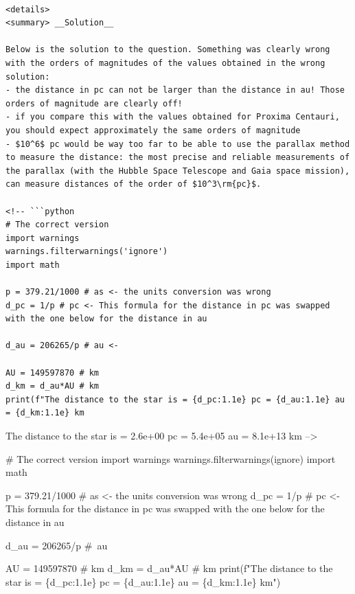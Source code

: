 \documentclass[
  letterpaper,
  DIV=11,
  numbers=noendperiod]{scrreprt}
\newenvironment{Shaded}{\begin{snugshade}}{\end{snugshade}}
\newcommand{\BuiltInTok}[1]{\textcolor[rgb]{0.00,0.23,0.31}{#1}}
\newcommand{\CommentTok}[1]{\textcolor[rgb]{0.37,0.37,0.37}{#1}}
\newcommand{\DecValTok}[1]{\textcolor[rgb]{0.68,0.00,0.00}{#1}}
\newcommand{\FloatTok}[1]{\textcolor[rgb]{0.68,0.00,0.00}{#1}}
\newcommand{\ImportTok}[1]{\textcolor[rgb]{0.00,0.46,0.62}{#1}}
\newcommand{\NormalTok}[1]{\textcolor[rgb]{0.00,0.23,0.31}{#1}}
\newcommand{\OperatorTok}[1]{\textcolor[rgb]{0.37,0.37,0.37}{#1}}
\newcommand{\SpecialCharTok}[1]{\textcolor[rgb]{0.37,0.37,0.37}{#1}}
\newcommand{\SpecialStringTok}[1]{\textcolor[rgb]{0.13,0.47,0.30}{#1}}
\newcommand{\StringTok}[1]{\textcolor[rgb]{0.13,0.47,0.30}{#1}}
\begin{document}
\begin{verbatim}

<details>
<summary> __Solution__

Below is the solution to the question. Something was clearly wrong with the orders of magnitudes of the values obtained in the wrong solution:
- the distance in pc can not be larger than the distance in au! Those orders of magnitude are clearly off!
- if you compare this with the values obtained for Proxima Centauri, you should expect approximately the same orders of magnitude
- $10^6$ pc would be way too far to be able to use the parallax method to measure the distance: the most precise and reliable measurements of the parallax (with the Hubble Space Telescope and Gaia space mission), can measure distances of the order of $10^3\rm{pc}$.

<!-- ```python 
# The correct version
import warnings
warnings.filterwarnings('ignore')
import math

p = 379.21/1000 # as <- the units conversion was wrong
d_pc = 1/p # pc <- This formula for the distance in pc was swapped with the one below for the distance in au

d_au = 206265/p # au <-

AU = 149597870 # km
d_km = d_au*AU # km
print(f"The distance to the star is = {d_pc:1.1e} pc = {d_au:1.1e} au = {d_km:1.1e} km
\end{verbatim}

The distance to the star is = 2.6e+00 pc = 5.4e+05 au = 8.1e+13 km
--\textgreater{}

\begin{Shaded}
\begin{Highlighting}[]
\CommentTok{\# The correct version}
\ImportTok{import}\NormalTok{ warnings}
\NormalTok{warnings.filterwarnings(}\StringTok{\textquotesingle{}ignore\textquotesingle{}}\NormalTok{)}
\ImportTok{import}\NormalTok{ math}

\NormalTok{p }\OperatorTok{=} \FloatTok{379.21}\OperatorTok{/}\DecValTok{1000} \CommentTok{\# as \textless{}{-} the units conversion was wrong}
\NormalTok{d\_pc }\OperatorTok{=} \DecValTok{1}\OperatorTok{/}\NormalTok{p }\CommentTok{\# pc \textless{}{-} This formula for the distance in pc was swapped with the one below for the distance in au}

\NormalTok{d\_au }\OperatorTok{=} \DecValTok{206265}\OperatorTok{/}\NormalTok{p }\CommentTok{\# au}

\NormalTok{AU }\OperatorTok{=} \DecValTok{149597870} \CommentTok{\# km}
\NormalTok{d\_km }\OperatorTok{=}\NormalTok{ d\_au}\OperatorTok{*}\NormalTok{AU }\CommentTok{\# km}
\BuiltInTok{print}\NormalTok{(}\SpecialStringTok{f"The distance to the star is = }\SpecialCharTok{\{}\NormalTok{d\_pc}\SpecialCharTok{:1.1e\}}\SpecialStringTok{ pc = }\SpecialCharTok{\{}\NormalTok{d\_au}\SpecialCharTok{:1.1e\}}\SpecialStringTok{ au = }\SpecialCharTok{\{}\NormalTok{d\_km}\SpecialCharTok{:1.1e\}}\SpecialStringTok{ km"}\NormalTok{)}
\end{Highlighting}
\end{Shaded}
\end{document}

